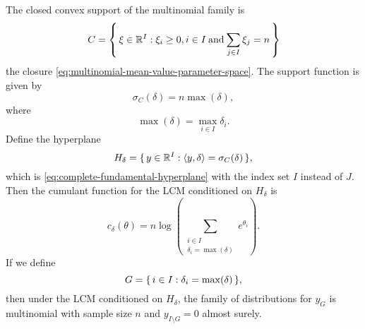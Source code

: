 \begin{theorem} \label{th:multinomial-lcm}
The closed convex support of the multinomial family is
$$
   C = \left\{\,  \xi \in \mathbb{R}^I : \xi_i \ge 0, i \in I \mathbin{\rm and}
   \sum_{j \in I} \xi_j = n  \,\right\}
$$
the closure \eqref{eq:multinomial-mean-value-parameter-space}.
The support function is given by
\begin{equation} \label{eq:multinomial-support-function}
   \sigma_C(\delta) = n \max(\delta),
\end{equation}
where
$$
   \max(\delta) = \max_{i \in I} \delta_i.
$$
Define the hyperplane
$$
   H_\delta = \{\,  y \in \mathbb{R}^I : \langle y, \delta \rangle = \sigma_C(\delta)  \,\},
$$
which is \eqref{eq:complete-fundamental-hyperplane} with the index set $I$
instead of $J$.
Then the cumulant function for the LCM conditioned on $H_\delta$ is
\begin{equation} \label{eq:multinomial-cumfun-lcm}
   c_\delta(\theta)
   =
   n \log \left(
   \sum_{\substack{i \in I \\ \delta_i = \max(\delta)}} e^{\theta_i} \right).
\end{equation}
If we define
$$
   G = \{\,  i \in I : \delta_i = \max(\delta)  \,\},
$$
then under the LCM conditioned on $H_\delta$, the family of distributions
for $y_G$ is multinomial with sample size $n$
and $y_{I \setminus G} = 0$ almost surely.
\end{theorem}
